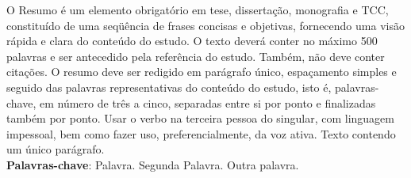 
\begin{resumo}[RESUMO]
\begin{SingleSpacing}


O Resumo é um elemento obrigatório em tese, dissertação, monografia e TCC, constituído de uma seqüência de frases concisas e objetivas, fornecendo uma visão rápida e clara do conteúdo do estudo. O texto deverá conter no máximo 500 palavras e ser antecedido
pela referência do estudo. Também, não deve conter citações. O resumo deve ser redigido em parágrafo único, espaçamento simples e seguido das palavras representativas do conteúdo do estudo, isto é, palavras-chave, em número de três a cinco, separadas entre si por ponto e finalizadas também por ponto. Usar o verbo na terceira pessoa do singular, com linguagem impessoal, bem como fazer uso, preferencialmente, da voz ativa. Texto contendo um único parágrafo.\\

\textbf{Palavras-chave}: Palavra. Segunda Palavra. Outra palavra.

\end{SingleSpacing}
\end{resumo}

